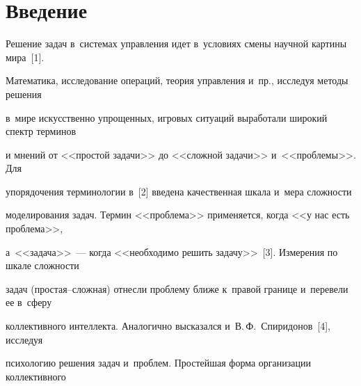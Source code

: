   























      \thispagestyle{headings}


      


\vspace*{-12pt}





\section{Введение}





  Решение задач в~системах управ\-ле\-ния идет в~условиях смены научной картины мира~[1]. 


Математика, исследование операций, теория управ\-ле\-ния и~пр., исследуя методы решения 


в~мире искусственно упрощенных, игровых ситуаций выработали широкий спектр терминов 


и мнений от <<простой задачи>> до <<сложной задачи>> и~<<проблемы>>. Для 


упорядочения терминологии в~[2] введена качественная шкала и~мера сложности 


моделирования задач. Термин <<проблема>> применяется, когда <<у нас есть проблема>>, 


а~<<задача>>~--- когда <<необходимо решить задачу>>~[3]. Измерения по шкале сложности 


задач (прос\-тая--слож\-ная) отнесли проблему ближе к~правой границе и~перевели ее в~сферу 


коллективного интеллекта. Аналогично высказался и~В.\,Ф.~Спиридонов~[4], исследуя 


психологию решения задач и~проблем. Простейшая форма организации коллективного 


